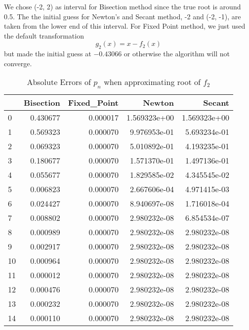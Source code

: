 \documentclass[a4paper,12pt]{article}
\begin{document}
We chose (-2, 2) as interval for Bisection method since the true root is around 0.5.
The the initial guess for Newton's and Secant method,
-2 and (-2, -1),
are taken from the lower end of this interval.
For Fixed Point method, we just used the default transformation
$$
g_2(x) = x - f_2(x)
$$
but made the initial guess at $-0.43066$ or otherwise the algorithm will not converge.

\begin{table}[H]
\begin{center}
	\begin{tabular}{lrrrr}
	\toprule
	{} &  Bisection &  Fixed\_Point &        Newton &        Secant \\
	\midrule
	0  &   0.430677 &     0.000017 &  1.569323e+00 &  1.569323e+00 \\
	1  &   0.569323 &     0.000070 &  9.976953e-01 &  5.693234e-01 \\
	2  &   0.069323 &     0.000070 &  5.010892e-01 &  4.193235e-01 \\
	3  &   0.180677 &     0.000070 &  1.571370e-01 &  1.497136e-01 \\
	4  &   0.055677 &     0.000070 &  1.829585e-02 &  4.345545e-02 \\
	5  &   0.006823 &     0.000070 &  2.667606e-04 &  4.971415e-03 \\
	6  &   0.024427 &     0.000070 &  8.940697e-08 &  1.716018e-04 \\
	7  &   0.008802 &     0.000070 &  2.980232e-08 &  6.854534e-07 \\
	8  &   0.000989 &     0.000070 &  2.980232e-08 &  2.980232e-08 \\
	9  &   0.002917 &     0.000070 &  2.980232e-08 &  2.980232e-08 \\
	10 &   0.000964 &     0.000070 &  2.980232e-08 &  2.980232e-08 \\
	11 &   0.000012 &     0.000070 &  2.980232e-08 &  2.980232e-08 \\
	12 &   0.000476 &     0.000070 &  2.980232e-08 &  2.980232e-08 \\
	13 &   0.000232 &     0.000070 &  2.980232e-08 &  2.980232e-08 \\
	14 &   0.000110 &     0.000070 &  2.980232e-08 &  2.980232e-08 \\
	\bottomrule
	\end{tabular}
	\caption{Absolute Errors of $p_n$ when approximating root of $f_2$}
\end{center}
\end{table}
\end{document}
